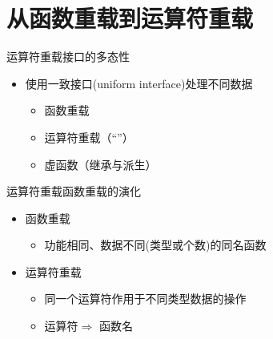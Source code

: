 \section[运算符重载]{从函数重载到运算符重载}\label{sec:chap04-sec01}
\begin{frame}[t, fragile]{运算符重载}{接口的多态性}%
  \begin{spacing}{1.8}
    \begin{itemize}
    \item 使用一致接口(uniform interface)处理不同数据
    \begin{itemize} 
    \item 函数重载 
    \item 运算符重载（``\cppinttfts{+}''）
      \begin{center}
      \end{center}
    \item 虚函数（继承与派生）
    \end{itemize}  
    \end{itemize}
  \end{spacing}
\end{frame}

\begin{frame}[t, fragile]{运算符重载}{函数重载的演化}%
  \stretchon
  \begin{itemize}
  \item 函数重载
    \begin{itemize}
    \item 功能相同、数据不同(类型或个数)的同名函数
    \end{itemize}
  \item 运算符重载
    \begin{itemize}
    \item 同一个运算符作用于不同类型数据的操作
    \item 运算符$\Rightarrow$ \alert{函数名}
    \end{itemize}
  \end{itemize}
  \stretchoff
\end{frame}

